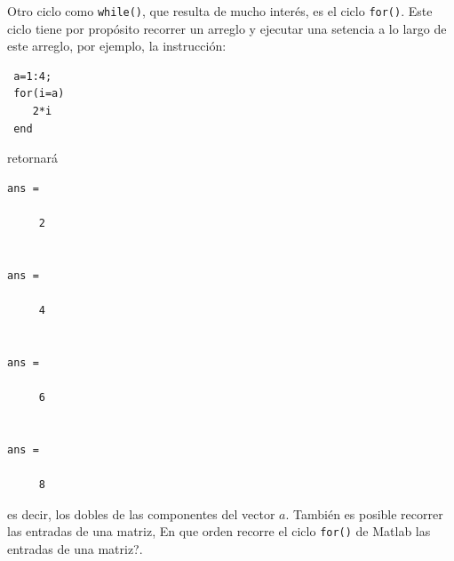 \documentclass[11pt,legalpaper]{article}
\begin{document}
Otro ciclo como \texttt{while()}, que resulta de mucho inter\'es, es el ciclo \texttt{for()}. Este ciclo tiene por prop\'osito recorrer un arreglo y ejecutar una setencia a lo largo de este arreglo, por ejemplo, la instrucci\'on:
\begin{lstlisting}
 a=1:4;
 for(i=a)
    2*i
 end
\end{lstlisting}
retornar\'a
\begin{verbatim}
ans =

     2


ans =

     4


ans =

     6


ans =

     8

\end{verbatim}
es decir, los dobles de las componentes del vector $a$. Tambi\'en es posible recorrer las entradas de una matriz, \textquestiondown En que orden recorre el ciclo \texttt{for()} de Matlab las entradas de una matriz?.
\end{document}
